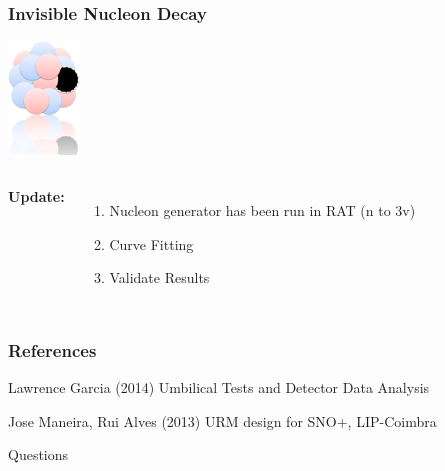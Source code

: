 \documentclass{beamer}
\begin{document}
\begin{frame}
\frametitle{Invisible Nucleon Decay}
\centering
\includegraphics[height=3cm]{nuc}
\begin{columns}[t] %

\textbf{Update:}
\begin{enumerate}
\item Nucleon generator has been run in RAT (n to 3v)
\item Curve Fitting
\item Validate Results

\end{enumerate}



\end{columns}

\end{frame}

\begin{frame}
\frametitle{References}
\footnotesize{
\begin{thebibliography}{99} %
 Lawrence Garcia (2014)
\newblock Umbilical Tests and Detector Data Analysis


 Jose Maneira, Rui Alves (2013)
\newblock URM design for SNO+, LIP-Coimbra

\end{thebibliography}
}
\end{frame}


\begin{frame}
\Huge{\centerline{Questions}}
\end{frame}

\end{document}
